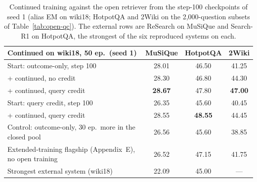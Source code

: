 \begin{table}[t]
\centering
\small
\begin{tabular}{lccc}
\toprule
Continued on wiki18, 50 ep.\ (seed 1) & MuSiQue & HotpotQA & 2Wiki \\
\midrule
Start: outcome-only, step 100      & 28.01 & 46.50 & 41.25 \\
\quad + continued, no credit       & 28.30 & 46.80 & 44.30 \\
\quad + continued, query credit    & \textbf{28.67} & 47.80 & \textbf{47.00} \\
Start: query credit, step 100      & 26.35 & 45.60 & 40.45 \\
\quad + continued, query credit    & 28.55 & \textbf{48.55} & 44.45 \\
\midrule
Control: outcome-only, 30 ep.\ more in the closed pool & 26.56 & 45.60 & 38.85 \\
Extended-training flagship (Appendix~E), no open training & 26.52 & 47.15 & 41.75 \\
Strongest external system (wiki18)  & 22.09 & 45.00 & --- \\
\bottomrule
\end{tabular}
\caption{Continued training against the open retriever from the
step-100 checkpoints of seed 1 (alias EM on wiki18; HotpotQA and 2Wiki
on the 2{,}000-question subsets of Table~\ref{tab:open-qc}). The
external rows are ReSearch on MuSiQue and Search-R1 on HotpotQA, the
strongest of the six reproduced systems on each.}
\label{tab:stage2}
\end{table}
